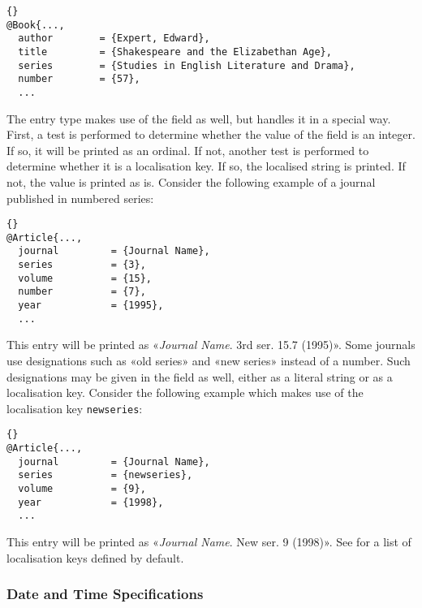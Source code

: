 \documentclass{ltxdockit}[2011/03/25]
\begin{document}
\begin{lstlisting}[style=bibtex]{}
@Book{...,
  author        = {Expert, Edward},
  title         = {Shakespeare and the Elizabethan Age},
  series        = {Studies in English Literature and Drama},
  number        = {57},
  ...
\end{lstlisting}
%
The  entry type makes use of the  field as well, but handles it in a special way. First, a test is performed to determine whether the value of the field is an integer. If so, it will be printed as an ordinal. If not, another test is performed to determine whether it is a localisation key. If so, the localised string is printed. If not, the value is printed as is. Consider the following example of a journal published in numbered series:

\begin{lstlisting}[style=bibtex]{}
@Article{...,
  journal         = {Journal Name},
  series          = {3},
  volume          = {15},
  number          = {7},
  year            = {1995},
  ...
\end{lstlisting}
%
This entry will be printed as «\emph{Journal Name}. 3rd ser. 15.7 (1995)». Some journals use designations such as «old series» and «new series» instead of a number. Such designations may be given in the  field as well, either as a literal string or as a localisation key. Consider the following example which makes use of the localisation key \texttt{newseries}:

\begin{lstlisting}[style=bibtex]{}
@Article{...,
  journal         = {Journal Name},
  series          = {newseries},
  volume          = {9},
  year            = {1998},
  ...
\end{lstlisting}
%
This entry will be printed as «\emph{Journal Name}. New ser. 9 (1998)». See  for a list of localisation keys defined by default.

\subsubsection{Date and Time Specifications}
\label{bib:use:dat}
\end{document}
